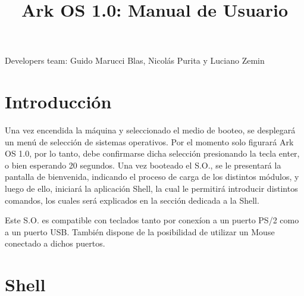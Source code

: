 \documentclass[a4paper,12pt]{article}
\title{Ark OS 1.0: Manual de Usuario}
\date{}
\begin{document}
	\maketitle
	\newpage
	Developers team: Guido Marucci Blas, Nicolás Purita y Luciano Zemin
	
\section{Introducción}

	Una vez encendida la máquina y seleccionado el medio de booteo, se desplegará un menú de selección de sistemas operativos. Por el momento solo figurará Ark OS 1.0, por lo tanto,  debe confirmarse dicha selección presionando la tecla enter, o bien esperando 20 segundos.
Una vez booteado el S.O., se le presentará la pantalla de bienvenida, indicando el proceso de carga de los distintos módulos, y luego de ello, iniciará la aplicación Shell, la cual le permitirá introducir distintos comandos, los cuales será explicados en la sección dedicada a la Shell.
	\par Este S.O. es compatible con teclados tanto por conexíon a un puerto PS/2 como a un puerto USB. También dispone de la posibilidad de utilizar un Mouse conectado a dichos puertos.

\section{Shell}
\end{document}
